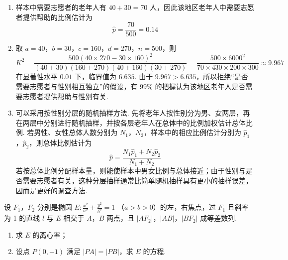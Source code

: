 \begin{solution}
\begin{enumerate}
\item 样本中需要志愿者的老年人有 \(40+30=70\) 人，因此该地区老年人中需要志愿者提供帮助的比例估计为
\[
\hat p=\frac{70}{500}=0.14
\]

\item 取 \(a=40\)，\(b=30\)，\(c=160\)，\(d=270\)，\(n=500\)，则
\[
K^2=\frac{500(40\times270-30\times160)^2}
{(40+30)(160+270)(40+160)(30+270)}
=\frac{500\times6000^2}{70\times430\times200\times300}
\approx9.967
\]
在显著性水平 \(0.01\) 下，临界值为 \(6.635\). 由于 \(9.967>6.635\)，所以拒绝“是否需要志愿者与性别相互独立”的假设，有 \(99\%\) 的把握认为该地区老年人是否需要志愿者提供帮助与性别有关.

\item 可以采用按性别分层的随机抽样方法. 先将老年人按性别分为男、女两层，再在两层中分别进行随机抽样，并按各层老年人在总体中的比例加权估计总体比例. 若男性、女性总体人数分别为 \(N_1\)，\(N_2\)，样本中的相应比例估计分别为 \(\hat p_1\)，\(\hat p_2\)，则总体比例估计为
\[
\hat p=\frac{N_1\hat p_1+N_2\hat p_2}{N_1+N_2}
\]
若按总体比例分配样本量，则能使样本中男女比例与总体接近；由于性别与是否需要志愿者有关，这种分层抽样通常比简单随机抽样具有更小的抽样误差，因而是更好的调查方法.
\end{enumerate}
\end{solution}

\begin{problem}
设 \(F_{1}\)，\(F_{2}\) 分别是椭圆 \(E: \frac{x^{2}}{a^{2}} + \frac{y^{2}}{b^{2}} = 1 \) （\(a > b > 0\)）的左，右焦点，过 \(F_{1}\) 且斜率为 1 的直线 \(l\) 与 \(E\) 相交于 \(A\)，\(B\) 两点，且 \(|AF_{2}|\)，\(|AB|\)，\(|BF_{2}|\) 成等差数列.

\begin{enumerate}
\item 求 \(E\) 的离心率；
\item 设点 \(P(0, -1)\) 满足 \(|PA| = |PB|\)，求 \(E\) 的方程.
\end{enumerate}
\end{problem}


